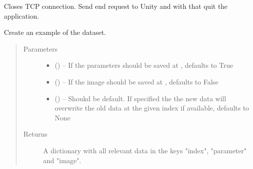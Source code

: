 \documentclass[letterpaper,10pt,english]{sphinxmanual}
\begin{document}
\begin{fulllineitems}
\begin{fulllineitems}
\label{\detokenize{index:dataset.dataset_cuboids.exit}}
Closes TCP connection. Send end request to Unity and with that quit the application.

\end{fulllineitems}


\begin{fulllineitems}
\label{\detokenize{index:dataset.dataset_cuboids.get_example}}
Create an example of the dataset.
\begin{quote}\begin{description}
\item[{Parameters}] \leavevmode\begin{itemize}
\item {} 
 (\sphinxstyleliteralemphasis{\sphinxupquote{, }}) -- If the parameters should be saved at , defaults to True

\item {} 
 (\sphinxstyleliteralemphasis{\sphinxupquote{, }}) -- If the image should be saved at , defaults to False

\item {} 
 (\sphinxstyleliteralemphasis{\sphinxupquote{, }}) -- Shoukd be default. If specified the the new data will overwrite the old data at the given index if available, defaults to None

\end{itemize}

\item[{Returns}] \leavevmode
A dictionary with all relevant data in the keys "index", "parameter" and "image".


\end{description}
\end{quote}
\end{fulllineitems}
\end{fulllineitems}
\end{document}
